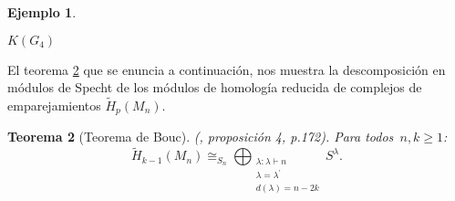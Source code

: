 \documentclass[12pt]{book}
\newtheorem{theorem}{Teorema}[section]
\theoremstyle{definition}
\newtheorem{example}[theorem]{Ejemplo}
\newcounter{in}
\newcounter{ini}
\begin{document}
\begin{example}
\begin{center}
\begin{minipage}{0.38\linewidth}

    $K(G_{4})$
  \end{minipage}
\end{center}
\end{example}
El teorema \ref{bouc} que se enuncia a continuación, nos muestra la descomposición en módulos de
Specht de los módulos de homología reducida de complejos de emparejamientos $\widetilde H_{p}(M_{n})$. 

\begin{theorem}[Teorema de Bouc]{\normalfont(\cite{MR756517}, proposición 4, p.172)}.
Para todos~$n,k\geq1$:
\begin{equation*}
  \widetilde H_{k-1}(M_{n})\cong_{S_{n}}\bigoplus_{\substack{\lambda:\lambda\vdash n\\
      \lambda=\lambda^{'}\\d(\lambda)=n-2k}} S^{\lambda}.
\end{equation*}
\label{bouc}
\end{theorem}
\end{document}
